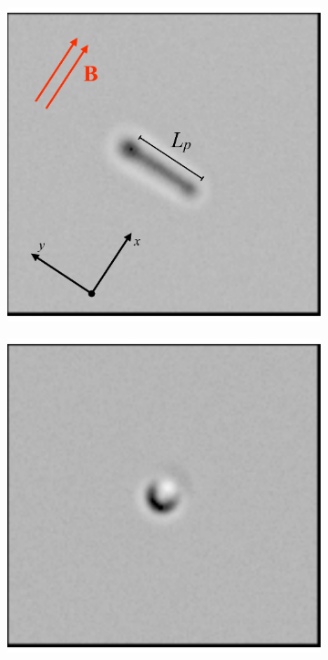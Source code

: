 \documentclass[aps,prl,superscriptaddress]{revtex4-1}
\begin{document}
\begin{figure}
\begin{subfigure}[t]{0.26\columnwidth}
    	\includegraphics[width=\textwidth]{figs/Figure3bb}
    	\caption{\label{horizontal}}
    \end{subfigure}
	\begin{subfigure}[t]{0.26\columnwidth}
    	\includegraphics[width=\textwidth]{figs/Figure3ba}

\end{subfigure}
\end{figure}
\end{document}
